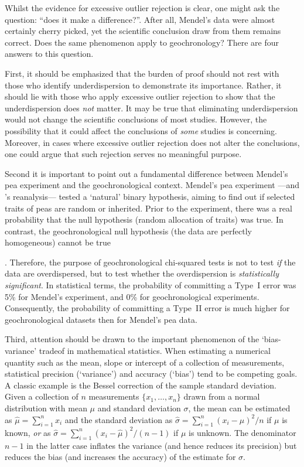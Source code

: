 \documentclass{article}
\begin{document}
Whilst the evidence for excessive outlier rejection is clear, one
might ask the question: ``does it make a difference?''. After all,
Mendel's data were almost certainly cherry picked, yet the scientific
conclusion draw from them remains correct. Does the same phenomenon
apply to geochronology? There are four answers to this
question.\medskip

First, it should be emphasized that the burden of proof should not
rest with those who identify underdispersion to demonstrate its
importance. Rather, it should lie with those who apply excessive
outlier rejection to show that the underdispersion does \emph{not}
matter. It may be true that eliminating underdispersion would not
change the scientific conclusions of most studies. However, the
possibility that it could affect the conclusions of \emph{some}
studies is concerning. Moreover, in cases where excessive outlier
rejection does not alter the conclusions, one could argue that such
rejection serves no meaningful purpose.\medskip

Second it is important to point out a fundamental difference between
Mendel's pea experiment and the geochronological context. Mendel's pea
experiment ---and \citet{fisher1936}'s reanalysis--- tested a `natural'
binary hypothesis, aiming to find out if selected traits of peas are
random or inherited.  Prior to the experiment, there was a real
probability that the null hypothesis (random allocation of traits) was
true. In contrast, the geochronological null hypothesis (the data are
perfectly homogeneous) cannot be true

\citep{vermeesch2025c}. Therefore, the purpose of geochronological
chi-squared tests is not to test \emph{if} the data are overdispersed,
but to test whether the overdispersion is \emph{statistically
significant}. In statistical terms, the probability of committing a
Type~I error was 5\% for Mendel's experiment, and 0\% for
geochronological experiments. Consequently, the probability of
committing a Type~II error is much higher for geochronological
datasets then for Mendel's pea data.\medskip

Third, attention should be drawn to the important phenomenon of the
`bias-variance' tradeof in mathematical statistics. When estimating a
numerical quantity such as the mean, slope or intercept of a
collection of measurements, statistical precision (`variance') and
accuracy (`bias') tend to be competing goals. A classic example is the
Bessel correction of the sample standard deviation. Given a collection
of $n$ measurements $\{x_1,\ldots,x_n\}$ drawn from a normal
distribution with mean $\mu$ and standard deviation $\sigma$, the mean
can be estimated as $\hat{\mu} = \sum_{i=1}^n x_i$ and the standard
deviation as $\hat{\sigma} = \sum_{i=1}^{n}(x_i-\mu)^2/n$ if $\mu$ is
known, \emph{or} as $\hat{\sigma} =
\sum_{i=1}^{n}(x_i-\hat{\mu})^2/(n-1)$ if $\mu$ is unknown. The
denominator $n-1$ in the latter case inflates the variance (and hence
reduces its precision) but reduces the bias (and increases the
accuracy) of the estimate for $\sigma$.\medskip
\end{document}
